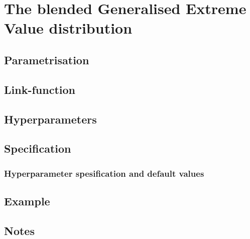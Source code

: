 \documentclass[a4paper,11pt]{article}
\begin{document}
\section*{The blended Generalised Extreme Value distribution}

\subsection*{Parametrisation}

\subsection*{Link-function}


\subsection*{Hyperparameters}

\subsection*{Specification}


\subsubsection*{Hyperparameter spesification and default values}


\subsection*{Example}

\subsection*{Notes}
\end{document}
